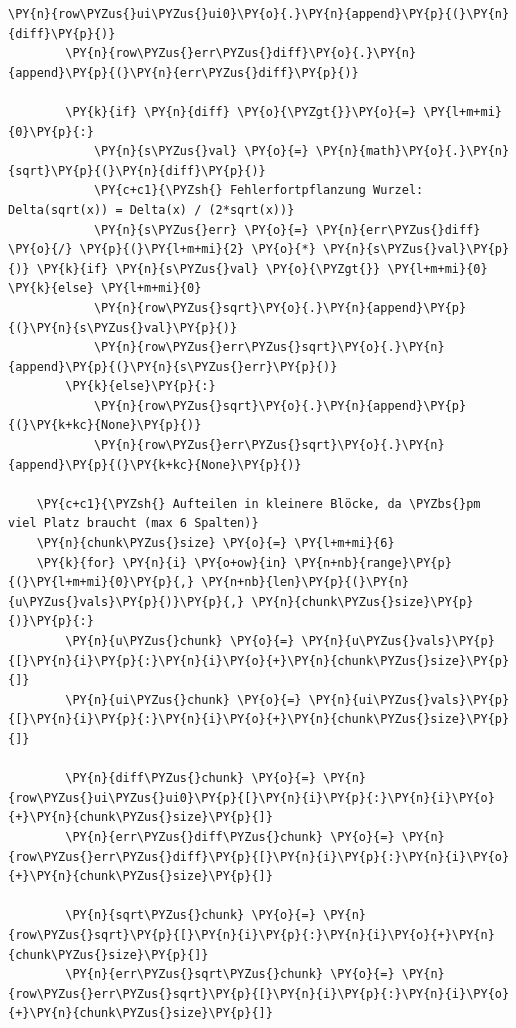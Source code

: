 \begin{tcolorbox}[breakable, size=fbox, boxrule=1pt, pad at break*=1mm,colback=cellbackground, colframe=cellborder]
\begin{Verbatim}[commandchars=\\\{\}]
        \PY{n}{row\PYZus{}ui\PYZus{}ui0}\PY{o}{.}\PY{n}{append}\PY{p}{(}\PY{n}{diff}\PY{p}{)}
        \PY{n}{row\PYZus{}err\PYZus{}diff}\PY{o}{.}\PY{n}{append}\PY{p}{(}\PY{n}{err\PYZus{}diff}\PY{p}{)}
        
        \PY{k}{if} \PY{n}{diff} \PY{o}{\PYZgt{}}\PY{o}{=} \PY{l+m+mi}{0}\PY{p}{:}
            \PY{n}{s\PYZus{}val} \PY{o}{=} \PY{n}{math}\PY{o}{.}\PY{n}{sqrt}\PY{p}{(}\PY{n}{diff}\PY{p}{)}
            \PY{c+c1}{\PYZsh{} Fehlerfortpflanzung Wurzel: Delta(sqrt(x)) = Delta(x) / (2*sqrt(x))}
            \PY{n}{s\PYZus{}err} \PY{o}{=} \PY{n}{err\PYZus{}diff} \PY{o}{/} \PY{p}{(}\PY{l+m+mi}{2} \PY{o}{*} \PY{n}{s\PYZus{}val}\PY{p}{)} \PY{k}{if} \PY{n}{s\PYZus{}val} \PY{o}{\PYZgt{}} \PY{l+m+mi}{0} \PY{k}{else} \PY{l+m+mi}{0}
            \PY{n}{row\PYZus{}sqrt}\PY{o}{.}\PY{n}{append}\PY{p}{(}\PY{n}{s\PYZus{}val}\PY{p}{)}
            \PY{n}{row\PYZus{}err\PYZus{}sqrt}\PY{o}{.}\PY{n}{append}\PY{p}{(}\PY{n}{s\PYZus{}err}\PY{p}{)}
        \PY{k}{else}\PY{p}{:}
            \PY{n}{row\PYZus{}sqrt}\PY{o}{.}\PY{n}{append}\PY{p}{(}\PY{k+kc}{None}\PY{p}{)}
            \PY{n}{row\PYZus{}err\PYZus{}sqrt}\PY{o}{.}\PY{n}{append}\PY{p}{(}\PY{k+kc}{None}\PY{p}{)}
            
    \PY{c+c1}{\PYZsh{} Aufteilen in kleinere Blöcke, da \PYZbs{}pm viel Platz braucht (max 6 Spalten)}
    \PY{n}{chunk\PYZus{}size} \PY{o}{=} \PY{l+m+mi}{6}
    \PY{k}{for} \PY{n}{i} \PY{o+ow}{in} \PY{n+nb}{range}\PY{p}{(}\PY{l+m+mi}{0}\PY{p}{,} \PY{n+nb}{len}\PY{p}{(}\PY{n}{u\PYZus{}vals}\PY{p}{)}\PY{p}{,} \PY{n}{chunk\PYZus{}size}\PY{p}{)}\PY{p}{:}
        \PY{n}{u\PYZus{}chunk} \PY{o}{=} \PY{n}{u\PYZus{}vals}\PY{p}{[}\PY{n}{i}\PY{p}{:}\PY{n}{i}\PY{o}{+}\PY{n}{chunk\PYZus{}size}\PY{p}{]}
        \PY{n}{ui\PYZus{}chunk} \PY{o}{=} \PY{n}{ui\PYZus{}vals}\PY{p}{[}\PY{n}{i}\PY{p}{:}\PY{n}{i}\PY{o}{+}\PY{n}{chunk\PYZus{}size}\PY{p}{]}
        
        \PY{n}{diff\PYZus{}chunk} \PY{o}{=} \PY{n}{row\PYZus{}ui\PYZus{}ui0}\PY{p}{[}\PY{n}{i}\PY{p}{:}\PY{n}{i}\PY{o}{+}\PY{n}{chunk\PYZus{}size}\PY{p}{]}
        \PY{n}{err\PYZus{}diff\PYZus{}chunk} \PY{o}{=} \PY{n}{row\PYZus{}err\PYZus{}diff}\PY{p}{[}\PY{n}{i}\PY{p}{:}\PY{n}{i}\PY{o}{+}\PY{n}{chunk\PYZus{}size}\PY{p}{]}
        
        \PY{n}{sqrt\PYZus{}chunk} \PY{o}{=} \PY{n}{row\PYZus{}sqrt}\PY{p}{[}\PY{n}{i}\PY{p}{:}\PY{n}{i}\PY{o}{+}\PY{n}{chunk\PYZus{}size}\PY{p}{]}
        \PY{n}{err\PYZus{}sqrt\PYZus{}chunk} \PY{o}{=} \PY{n}{row\PYZus{}err\PYZus{}sqrt}\PY{p}{[}\PY{n}{i}\PY{p}{:}\PY{n}{i}\PY{o}{+}\PY{n}{chunk\PYZus{}size}\PY{p}{]}
        

\end{Verbatim}
\end{tcolorbox}
